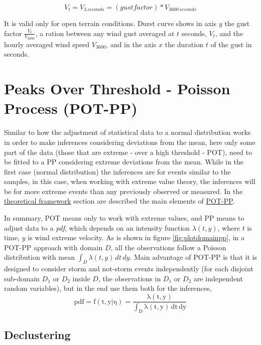 \documentclass[12pt,oneside]{reedthesis}
\begin{document}
\[
V_t = V_{3\,seconds} = (gust factor) * V_{3600\,seconds}
\]

It is valid only for open terrain conditions. Durst curve shows in axis \(y\) the gust factor \(\frac{V_t}{V_{3600}}\), a ration between any wind gust averaged at \(t\) seconds, \(V_t\), and the hourly averaged wind speed \(V_{3600}\), and in the axis \(x\) the duration \(t\) of the gust in seconds.

\hypertarget{pot-pp}{%
\section{Peaks Over Threshold - Poisson Process (POT-PP)}\label{pot-pp}}

Similar to how the adjustment of statistical data to a normal distribution works in order to make inferences considering deviations from the mean, here only some part of the data (those that are extreme - over a high threshold - POT), need to be fitted to a PP considering extreme deviations from the mean. While in the first case (normal distribution) the inferences are for events similar to the samples, in this case, when working with extreme value theory, the inferences will be for more extreme events than any previously observed or measured. In the \protect\hyperlink{rmd-thefra}{theoretical framework} section are described the main elements of \protect\hyperlink{pot-pp}{POT-PP}.

In summary, POT means only to work with extreme values, and PP means to adjust data to a \emph{pdf}, which depends on an intensity function \(\lambda(t,y)\), where \(t\) is time, \(y\) is wind extreme velocity. As is shown in figure \ref{fig:plotdomainpp}, in a POT-PP approach with domain \(D\), all the observations follow a Poisson distribution with mean \(\int_D\lambda(t,y)\,dt\,dy\). Main advantage of POT-PP is that it is designed to consider storm and not-storm events independently (for each disjoint sub-domain \(D_1\) or \(D_2\) inside \(D\), the observations in \(D_1\) or \(D_2\) are independent random variables), but in the end use them both for the inferences,
\begin{equation}
  \mathrm{
          pdf = f(t,y|\eta) = \frac{\lambda(t,y)}{\int_D\lambda(t,y)\,dt\,dy}
        }
  \label{eq:pppdf}
\end{equation}
\hypertarget{decluster}{%
\subsection{Declustering}\label{decluster}}
\end{document}
